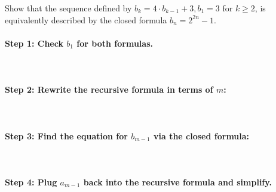         \begin{questionNOGRADE}{\thequestion}

            Show that the sequence defined by $b_{k} = 4 \cdot b_{k-1} + 3, b_{1} = 3$ for $k \geq 2$,
            is equivalently described by the closed formula $b_{n} = 2^{2n} - 1$.

        \paragraph{Step 1: Check $b_{1}$ for both formulas.} ~\\
            
        \paragraph{Step 2: Rewrite the recursive formula in terms of $m$:} ~\\

        \paragraph{Step 3: Find the equation for $b_{m-1}$ via the closed formula:} ~\\

        \paragraph{Step 4: Plug $a_{m-1}$ back into the recursive formula and simplify.} ~\\

        \end{questionNOGRADE}

